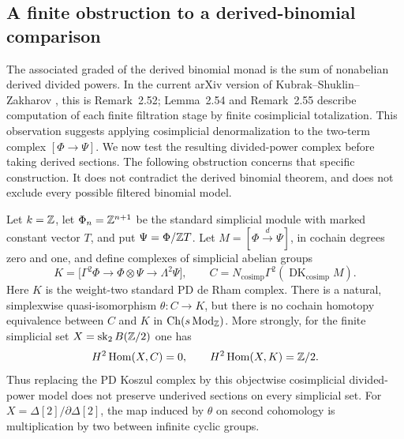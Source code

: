 \subsection{A finite obstruction to a derived-binomial comparison}

The associated graded of the derived binomial monad is the sum of
nonabelian derived divided powers. In the current arXiv version of
Kubrak--Shuklin--Zakharov \cite{A_KSZ}, this is Remark~2.52; Lemma~2.54 and
Remark~2.55 describe computation of each finite filtration stage by
finite cosimplicial totalization. This observation suggests applying
cosimplicial denormalization to the two-term complex
$[\Phi\to\Psi]$. We now test the resulting divided-power complex
before taking derived sections. The following obstruction concerns
that specific construction. It does not contradict the derived
binomial theorem, and does not exclude every possible filtered
binomial model.

\begin{theorem}
\label{sa08:A022}
Let $k=\mathbb Z$, let $\Phi_n=\mathbb Z^{n+1}$ be the standard simplicial module
with marked constant vector $T$, and put $\Psi=\Phi/\mathbb Z T$.
Let $M=[\Phi\xrightarrow{d}\Psi]$, in cochain degrees zero and one,
and define complexes of simplicial abelian groups
\[
 K=\bigl[\Gamma^2\Phi\longrightarrow\Phi\otimes\Psi
                  \longrightarrow\Lambda^2\Psi\bigr],\qquad
 C=N_{\mathrm{cosimp}}\Gamma^2
                 (\operatorname{DK}_{\mathrm{cosimp}}M).
\]
Here $K$ is the weight-two standard PD de Rham complex. There is a
natural, simplexwise quasi-isomorphism $\theta:C\to K$, but there
is no cochain homotopy equivalence between $C$ and $K$ in
$\operatorname{Ch}(s\operatorname{Mod}_{\mathbb Z})$.
More strongly, for the finite simplicial set
$X=\operatorname{sk}_2 B(\mathbb Z/2)$ one has
\[
 H^2\operatorname{Hom}(X,C)=0,\qquad
 H^2\operatorname{Hom}(X,K)=\mathbb Z/2.
\]
Thus replacing the PD Koszul complex by this objectwise
cosimplicial divided-power model does not preserve underived
sections on every simplicial set. For
$X=\Delta[2]/\partial\Delta[2]$, the map induced by $\theta$ on
second cohomology is multiplication by two between infinite cyclic
groups.
\end{theorem}

